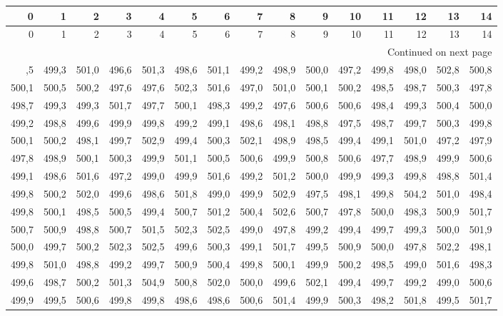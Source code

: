 \begin{longtable}{rrrrrrrrrrrrrrr}
\toprule
0 & 1 & 2 & 3 & 4 & 5 & 6 & 7 & 8 & 9 & 10 & 11 & 12 & 13 & 14 \\
\midrule
\endfirsthead
\toprule
0 & 1 & 2 & 3 & 4 & 5 & 6 & 7 & 8 & 9 & 10 & 11 & 12 & 13 & 14 \\
\midrule
\endhead
\midrule
\multicolumn{15}{r}{Continued on next page} \\
\midrule
\endfoot
\bottomrule
\endlastfoot
498,5 & 499,3 & 501,0 & 496,6 & 501,3 & 498,6 & 501,1 & 499,2 & 498,9 & 500,0 & 497,2 & 499,8 & 498,0 & 502,8 & 500,8 \\
500,1 & 500,5 & 500,2 & 497,6 & 497,6 & 502,3 & 501,6 & 497,0 & 501,0 & 500,1 & 500,2 & 498,5 & 498,7 & 500,3 & 497,8 \\
498,7 & 499,3 & 499,3 & 501,7 & 497,7 & 500,1 & 498,3 & 499,2 & 497,6 & 500,6 & 500,6 & 498,4 & 499,3 & 500,4 & 500,0 \\
499,2 & 498,8 & 499,6 & 499,9 & 499,8 & 499,2 & 499,1 & 498,6 & 498,1 & 498,8 & 497,5 & 498,7 & 499,7 & 500,3 & 499,8 \\
500,1 & 500,2 & 498,1 & 499,7 & 502,9 & 499,4 & 500,3 & 502,1 & 498,9 & 498,5 & 499,4 & 499,1 & 501,0 & 497,2 & 497,9 \\
497,8 & 498,9 & 500,1 & 500,3 & 499,9 & 501,1 & 500,5 & 500,6 & 499,9 & 500,8 & 500,6 & 497,7 & 498,9 & 499,9 & 500,6 \\
499,1 & 498,6 & 501,6 & 497,2 & 499,0 & 499,9 & 501,6 & 499,2 & 501,2 & 500,0 & 499,9 & 499,3 & 499,8 & 498,8 & 501,4 \\
499,8 & 500,2 & 502,0 & 499,6 & 498,6 & 501,8 & 499,0 & 499,9 & 502,9 & 497,5 & 498,1 & 499,8 & 504,2 & 501,0 & 498,4 \\
499,8 & 500,1 & 498,5 & 500,5 & 499,4 & 500,7 & 501,2 & 500,4 & 502,6 & 500,7 & 497,8 & 500,0 & 498,3 & 500,9 & 501,7 \\
500,7 & 500,9 & 498,8 & 500,7 & 501,5 & 502,3 & 502,5 & 499,0 & 497,8 & 499,2 & 499,4 & 499,7 & 499,3 & 500,0 & 501,9 \\
500,0 & 499,7 & 500,2 & 502,3 & 502,5 & 499,6 & 500,3 & 499,1 & 501,7 & 499,5 & 500,9 & 500,0 & 497,8 & 502,2 & 498,1 \\
499,8 & 501,0 & 498,8 & 499,2 & 499,7 & 500,9 & 500,4 & 499,8 & 500,1 & 499,9 & 500,2 & 498,5 & 499,0 & 501,6 & 498,3 \\
499,6 & 498,7 & 500,2 & 501,3 & 504,9 & 500,8 & 502,0 & 500,0 & 499,6 & 502,1 & 499,4 & 499,7 & 499,2 & 499,0 & 500,6 \\
499,9 & 499,5 & 500,6 & 499,8 & 499,8 & 498,6 & 498,6 & 500,6 & 501,4 & 499,9 & 500,3 & 498,2 & 501,8 & 499,5 & 501,7 \\

\end{longtable}
